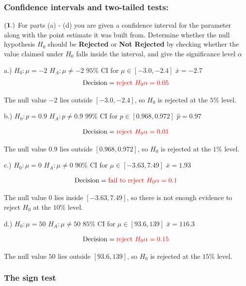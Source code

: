 \documentclass[
]{article}
\begin{document}
\subsubsection{Confidence intervals and two-tailed
tests:}\label{confidence-intervals-and-two-tailed-tests}

\(\bf (1.)\) For parts (a) - (d) you are given a confidence interval for
the parameter along with the point estimate it was built from. Determine
whether the null hypothesis \(H_0\) should be \textbf{Rejected} or
\textbf{Not Rejected} by checking whether the value claimed under
\(H_0\) falls inside the interval, and give the significance level
\(\alpha\)

a.) \(H_0: \mu = -2\) \(H_A: \mu \neq -2\) \(95\%\) CI for
\(\mu \in [-3.0, -2.4]\) \(\bar{x} = -2.7\)
\[ \text{Decision} = \color{red}{\text{reject} \ H_0} \\
  \alpha = \color{red}{0.05} \]

{The null value \(-2\) lies outside \([-3.0, -2.4]\), so \(H_0\) is
rejected at the \(5\%\) level.}

b.) \(H_0: p = 0.9\) \(H_A: p \neq 0.9\) \(99\%\) CI for
\(p \in [0.968, 0.972]\) \(\hat{p} = 0.97\)

\[ \text{Decision} = \color{red}{\text{reject} \ H_0} \\
  \alpha = \color{red}{0.01} \]

{The null value \(0.9\) lies outside \([0.968, 0.972]\), so \(H_0\) is
rejected at the \(1\%\) level.}

c.) \(H_0: \mu = 0\) \(H_A: \mu \neq 0\) \(90\%\) CI for
\(\mu \in [-3.63, 7.49]\) \(\bar{x} = 1.93\)

\[ \text{Decision} = \color{red}{\text{fail to reject} \ H_0} \\
  \alpha = \color{red}{0.1} \]

{The null value \(0\) lies inside \([-3.63, 7.49]\), so there is not
enough evidence to reject \(H_0\) at the \(10\%\) level.}

d.) \(H_0: \mu = 50\) \(H_A: \mu \neq 50\) \(85\%\) CI for
\(\mu \in [93.6, 139]\) \(\bar{x} = 116.3\)

\[ \text{Decision} = \color{red}{\text{reject} \ H_0} \\
  \alpha = \color{red}{0.15} \]

{The null value \(50\) lies outside \([93.6, 139]\), so \(H_0\) is
rejected at the \(15\%\) level.}

\subsubsection{The sign test}\label{the-sign-test}
\end{document}

